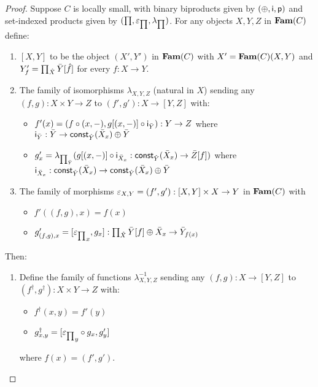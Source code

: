 \begin{proof}
Suppose $C$ is locally small, with binary biproducts given by $(\oplus,\mathsf{i},\mathsf{p})$ and set-indexed products
given by $(\prod,\varepsilon_{\prod},\lambda_{\prod})$. For any objects $X, Y, Z$ in $\mathbf{Fam}(C)$ define:

\begin{enumerate}
\item $[X, Y]$ to be the object $(X',Y')$ in $\mathbf{Fam}(C)$ with $X' = \mathbf{Fam}(C)(X,Y)$ and $Y'_f =
\prod_{\hat{X}}\bar{Y}[\hat{f}]$ for every $f: X \to Y$.
\item The family of isomorphisms $\lambda_{X,Y,Z}$ (natural in $X$) sending any $(f, g): X \times Y \to Z$ to
$(f', g'): X \to [Y, Z]$ with:
\begin{itemize}
\item $f'(x) = (f \circ (x, -), g[(x,-)] \circ \mathsf{i}_{\bar{Y}}):
Y \to Z$ where $\mathsf{i}_{\bar{Y}}: \bar{Y} \to \mathsf{const}_{\hat{Y}}(\bar{X}_x) \oplus \bar{Y}$
\item $g'_x = \lambda_{\prod_{\hat{Y}}}(g[(x,-)] \circ \mathsf{i}_{\bar{X}_x}:
\mathsf{const}_{\hat{Y}}(\bar{X}_x) \to \bar{Z}[f])$ where $\mathsf{i}_{\bar{X}_x}: \mathsf{const}_{\hat{Y}}(\bar{X}_x)
\to \mathsf{const}_{\hat{Y}}(\bar{X}_x) \oplus \bar{Y}$
\end{itemize}
\item The family of morphisms $\varepsilon_{X,Y} = (f',g'): [X, Y] \times X \to Y$ in $\mathbf{Fam}(C)$ with
\begin{itemize}
\item $f'((f, g), x) = f(x)$
\item $g'_{(f,g), x} = [{\varepsilon_{\prod}}_x, g_x]:
\prod_{\hat{X}}\bar{Y}[f] \oplus \bar{X}_x \to \bar{Y}_{f(x)}$
\end{itemize}
\end{enumerate}

Then:

\begin{enumerate}
\item Define the family of functions $\lambda^{-1}_{X,Y,Z}$ sending any $(f,g): X \to [Y,Z]$ to $(f^\dagger,
g^\dagger): X \times Y \to Z$ with:
\begin{itemize}
\item $f^\dagger(x,y) = f'(y)$
\item $g^\dagger_{x,y} = [{\varepsilon_{\prod}}_y \circ g_x, g'_y]$
\end{itemize}
\noindent where $f(x) = (f',g')$.


\end{enumerate}
\end{proof}
